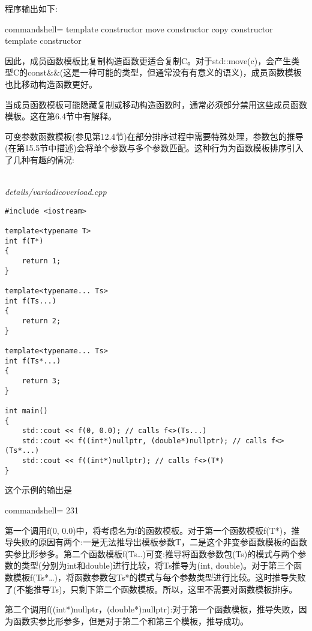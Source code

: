 程序输出如下:

\begin{tcblisting}{commandshell={}}
template constructor
move constructor
copy constructor
template constructor
\end{tcblisting}

因此，成员函数模板比复制构造函数更适合复制C。对于std::move(c)，会产生类型C的const\&\&(这是一种可能的类型，但通常没有有意义的语义)，成员函数模板也比移动构造函数更好。

当成员函数模板可能隐藏复制或移动构造函数时，通常必须部分禁用这些成员函数模板。这在第6.4节中有解释。


可变参数函数模板(参见第12.4节)在部分排序过程中需要特殊处理，参数包的推导(在第15.5节中描述)会将单个参数与多个参数匹配。这种行为为函数模板排序引入了几种有趣的情况:

\hspace*{\fill} \\ %
\noindent
\textit{details/variadicoverload.cpp}
\begin{lstlisting}[style=styleCXX]
#include <iostream>

template<typename T>
int f(T*)
{
	return 1;
}

template<typename... Ts>
int f(Ts...)
{
	return 2;
}

template<typename... Ts>
int f(Ts*...)
{
	return 3;
}

int main()
{
	std::cout << f(0, 0.0); // calls f<>(Ts...)
	std::cout << f((int*)nullptr, (double*)nullptr); // calls f<>(Ts*...)
	std::cout << f((int*)nullptr); // calls f<>(T*)
}
\end{lstlisting}

这个示例的输出是

\begin{tcblisting}{commandshell={}}
231
\end{tcblisting}

第一个调用f(0, 0.0)中，将考虑名为f的函数模板。对于第一个函数模板f(T*)，推导失败的原因有两个:一是无法推导出模板参数T，二是这个非变参函数模板的函数实参比形参多。第二个函数模板f(Ts…)可变:推导将函数参数包(Ts)的模式与两个参数的类型(分别为int和double)进行比较，将Ts推导为(int, double)。对于第三个函数模板f(Ts*…)，将函数参数包Ts*的模式与每个参数类型进行比较。这时推导失败了(不能推导Ts)，只剩下第二个函数模板。所以，这里不需要对函数模板排序。

第二个调用f((int*)nullptr，(double*)nullptr):对于第一个函数模板，推导失败，因为函数实参比形参多，但是对于第二个和第三个模板，推导成功。

